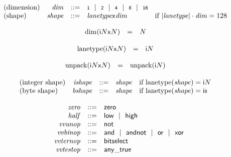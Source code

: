 \vspace{1ex}

$$
\begin{array}[t]{@{}lrrl@{}l@{}}
\mbox{(dimension)} & {\mathit{dim}} & ::= & \mathsf{{\scriptstyle 1}} ~~|~~ \mathsf{{\scriptstyle 2}} ~~|~~ \mathsf{{\scriptstyle 4}} ~~|~~ \mathsf{{\scriptstyle 8}} ~~|~~ \mathsf{{\scriptstyle 16}} \\
\mbox{(shape)} & {\mathit{shape}} & ::= & {{\mathit{lanetype}}}{\mathsf{x}}{{\mathit{dim}}} & \quad \mbox{if}~ {|{\mathit{lanetype}}|} \cdot {\mathit{dim}} = 128 \\
\end{array}
$$

\vspace{1ex}

$$
\begin{array}[t]{@{}lcl@{}l@{}}
{\mathrm{dim}}({{\mathsf{i}}{N}}{\mathsf{x}}{N}) & = & N \\
\end{array}
$$

$$
\begin{array}[t]{@{}lcl@{}l@{}}
{\mathrm{lanetype}}({{\mathsf{i}}{N}}{\mathsf{x}}{N}) & = & {\mathsf{i}}{N} \\
\end{array}
$$

$$
\begin{array}[t]{@{}lcl@{}l@{}}
{\mathrm{unpack}}({{\mathsf{i}}{N}}{\mathsf{x}}{N}) & = & {\mathrm{unpack}}({\mathsf{i}}{N}) \\
\end{array}
$$

\vspace{1ex}

$$
\begin{array}[t]{@{}lrrl@{}l@{}}
\mbox{(integer shape)} & {\mathit{ishape}} & ::= & {\mathit{shape}} & \quad \mbox{if}~ {\mathrm{lanetype}}({\mathit{shape}}) = {\mathsf{i}}{N} \\
\mbox{(byte shape)} & {\mathit{bshape}} & ::= & {\mathit{shape}} & \quad \mbox{if}~ {\mathrm{lanetype}}({\mathit{shape}}) = \mathsf{i{\scriptstyle 8}} \\
\end{array}
$$

\vspace{1ex}

$$
\begin{array}[t]{@{}lrrl@{}l@{}}
& {\mathit{zero}} & ::= & \mathsf{zero} \\
& {\mathit{half}} & ::= & \mathsf{low} ~~|~~ \mathsf{high} \\
& {\mathit{vvunop}} & ::= & \mathsf{not} \\
& {\mathit{vvbinop}} & ::= & \mathsf{and} ~~|~~ \mathsf{andnot} ~~|~~ \mathsf{or} ~~|~~ \mathsf{xor} \\
& {\mathit{vvternop}} & ::= & \mathsf{bitselect} \\
& {\mathit{vvtestop}} & ::= & \mathsf{any\_true} \\
\end{array}
$$

